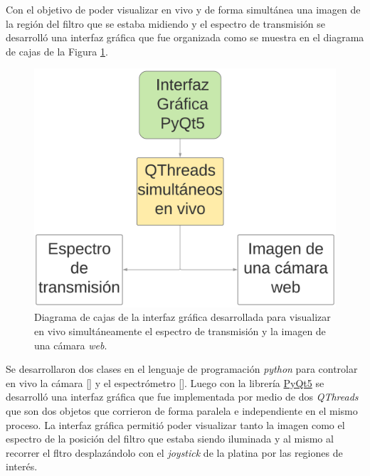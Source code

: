 Con el objetivo de poder visualizar en vivo y de forma simultánea una imagen de la región del filtro que se estaba midiendo y el espectro de transmisión se desarrolló una interfaz gráfica que fue organizada como se muestra en el diagrama de cajas de la Figura \ref{fig:diagcajas}.

\begin{figure}[H]
	\centering
	\includegraphics[scale=0.5]{Figs/microespectrometro/interfazespcam.png}
	\caption{Diagrama de cajas de la interfaz gráfica desarrollada para visualizar en vivo simultáneamente el espectro de transmisión y la imagen de una cámara \textit{web}.}
	\label{fig:diagcajas}
\end{figure}

Se desarrollaron dos clases en el lenguaje de programación \textit{python} para controlar en vivo la cámara [\href{https://github.com/jrr1984/defectsGUI/blob/master/views.py}{\faGithub}] y el espectrómetro [\href{https://github.com/jrr1984/defectsGUI/blob/master/Spectrometer.py}{\faGithub}]. Luego con la librería \href{https://pypi.org/project/PyQt5/}{PyQt5} se desarrolló una interfaz gráfica que fue implementada por medio de dos \textit{QThreads} que son dos objetos que corrieron de forma paralela e independiente en el mismo proceso. La interfaz gráfica permitió poder visualizar tanto la imagen como el espectro de la posición del filtro que estaba siendo iluminada y al mismo al recorrer el fltro desplazándolo con el \textit{joystick} de la platina por las regiones de interés.

